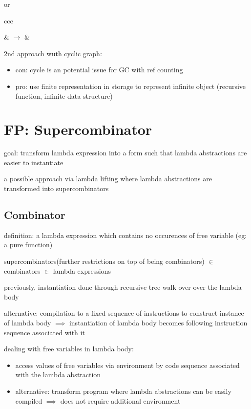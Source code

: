 \documentclass[8pt]{extarticle}
\begin{document}
\begin{multicols*}{2}
or

\begin{tblr}{ccc}
 &
$\rightarrow$ &
\end{tblr}

2nd approach wuth cyclic graph:
\begin{itemize}
\item con: cycle is an potential issue for GC with ref counting
\item pro: use finite representation in storage to represent infinite object (recursive function, infinite data structure)
\end{itemize}

\vfill\null
\columnbreak

\section{FP: Supercombinator}

goal: transform lambda expression into a form such that lambda abstractions are easier to instantiate

a possible approach via lambda lifting where lambda abstractions are transformed into supercombinators

\subsection{Combinator}
definition: a lambda expression which contains no occurences of free variable (eg: a pure function)

supercombinators(further restrictions on top of being combinators) $\in$ combinators $\in$ lambda expressions

previously, instantiation done through recursive tree walk over over the lambda body

alternative: compilation to a fixed sequence of instructions to construct instance of lambda body $\implies$ instantiation of lambda body becomes following instruction sequence associated with it

dealing with free variables in lambda body:
\begin{itemize}
\item access values of free variables via environment by code sequence associated with the lambda abstraction
\item alternative: transform program where lambda abstractions can be easily compiled $\implies$ does not require additional environment
\end{itemize}


\end{multicols*}
\end{document}
